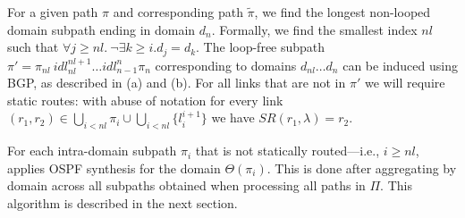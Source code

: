 For a given path $\pi$ and corresponding path $\tilde{\pi}$,
we find the longest non-looped domain subpath ending in domain
$d_n$. Formally, we find the smallest index $nl$ such that
$\forall j \geq nl. ~\neg\exists k \geq i. d_j = d_k$. 
The loop-free subpath $\pi'=\pi_{nl} ~idl_{nl}^{nl+1}\ldots idl_{n-1}^n \pi_n$ corresponding to
domains $d_{nl} \ldots d_n$
can be induced using BGP, as described in (a)
and (b).
For all links that are not in $\pi'$
we will require static routes: 
with abuse of notation for every link $(r_1,r_2)\in\bigcup_{i< nl} \pi_i\cup \bigcup_{i< nl}\{l_i^{i+1}\}$ 
we have
$SR(r_1, \lambda) = r_2$.

For each intra-domain subpath $\pi_i$ that is not statically routed---i.e., $i\geq nl$,
\name applies
OSPF synthesis for the domain $\Theta(\pi_i)$. 
This is done after aggregating by domain across all subpaths obtained when processing all paths in $\Pi$.
This algorithm is described in the next section.



